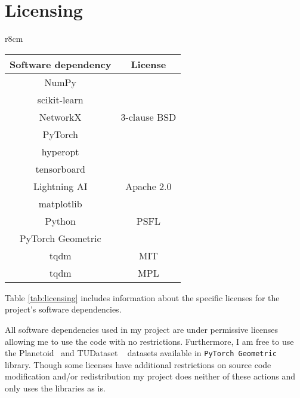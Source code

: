 \section{Licensing}
\begin{wraptable}[15]{r}{8cm}
    \centering
    \begin{tabular}{cc}
        \multicolumn{1}{c}{\textbf{Software dependency}} &
        \multicolumn{1}{c}{\textbf{License}} \\ 
        \midrule
        NumPy & \multirow{5}{*}{3-clause BSD} \\
        scikit-learn & \\
        NetworkX & \\
        PyTorch & \\
        hyperopt \footnotemark[9] & \\
        \rowcolor{gray!20} tensorboard & \\
        \rowcolor{gray!20} Lightning AI &  \multirow{-2}{*}{Apache 2.0}\\
        matplotlib & \\
        Python & \multirow{-2}{*}{PSFL}\\
        \rowcolor{gray!20}
        PyTorch Geometric & \\
        \rowcolor{gray!20}
        tqdm & \multirow{-2}{*}{MIT} \\
        tqdm & MPL\footnotemark[10] \\
    \end{tabular}
    \caption{Project dependency licenses}
    \label{tab:licensing}
\end{wraptable}


Table \ref{tab:licensing} includes information about the specific licenses for the project's software dependencies.

All software dependencies used in my project are under permissive licenses allowing me to use the code with no restrictions.
Furthermore, I am free to use the Planetoid~\cite{planetoid} and TUDataset ~\cite{Morris+2020} datasets available in \texttt{PyTorch Geometric}~\cite{Fey/Lenssen/2019} library.
Though some licenses have additional restrictions on source code modification and/or redistribution my project does neither of these actions and only uses the libraries as is.

